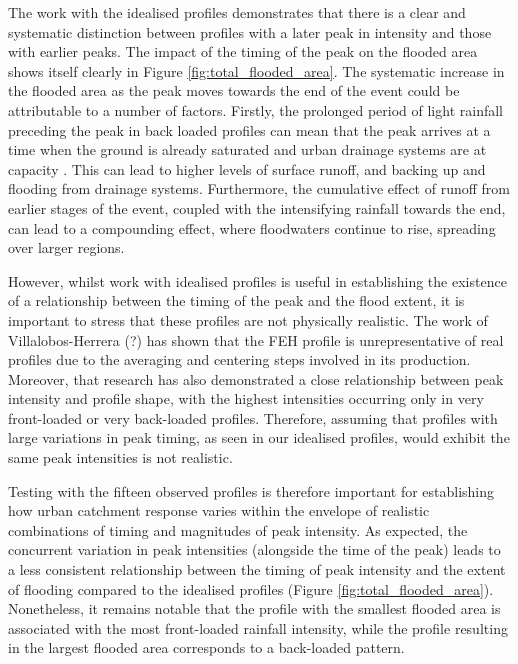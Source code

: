 \documentclass[APA,Times2COL]{WileyNJDv5}
\begin{document}

The work with the idealised profiles demonstrates that there is a clear and systematic distinction between profiles with a later peak in intensity and those with earlier peaks. The impact of the timing of the peak on the flooded area shows itself clearly in Figure \ref{fig:total_flooded_area}. The systematic increase in the flooded area as the peak moves towards the end of the event could be attributable to a number of factors. Firstly, the prolonged period of light rainfall preceding the peak in back loaded profiles can mean that the peak arrives at a time when the ground is already saturated and urban drainage systems are at capacity \citep{hettiarachchi2018increase}. This can lead to higher levels of surface runoff, and backing up and flooding from drainage systems. Furthermore, the cumulative effect of runoff from earlier stages of the event, coupled with the intensifying rainfall towards the end, can lead to a compounding effect, where floodwaters continue to rise, spreading over larger regions. 

However, whilst work with idealised profiles is useful in establishing the existence of a relationship between the timing of the peak and the flood extent, it is important to stress that these profiles are not physically realistic. The work of Villalobos-Herrera (?) has shown that the FEH profile is unrepresentative of real profiles due to the averaging and centering steps involved in its production. Moreover, that research has also demonstrated a close relationship between peak intensity and profile shape, with the highest intensities occurring only in very front-loaded or very back-loaded profiles. Therefore, assuming that profiles with large variations in peak timing, as seen in our idealised profiles, would exhibit the same peak intensities is not realistic.

Testing with the fifteen observed profiles is therefore important for establishing how urban catchment response varies within the envelope of realistic combinations of timing and magnitudes of peak intensity. As expected, the concurrent variation in peak intensities (alongside the time of the peak) leads to a less consistent relationship between the timing of peak intensity and the extent of flooding compared to the idealised profiles (Figure \ref{fig:total_flooded_area}). Nonetheless, it remains notable that the profile with the smallest flooded area is associated with the most front-loaded rainfall intensity, while the profile resulting in the largest flooded area corresponds to a back-loaded pattern.
\end{document}
